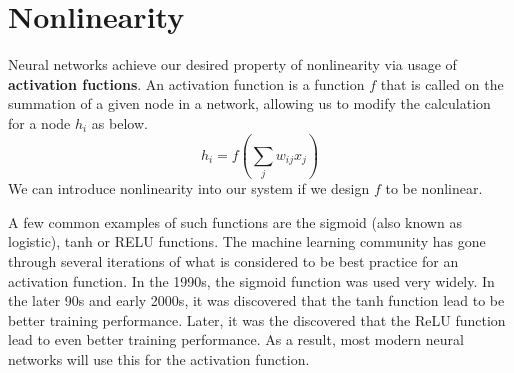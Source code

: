 \documentclass[12pt,letterpaper]{book}
\theoremstyle{definition}
\begin{document}
  \section{Nonlinearity}
  Neural networks achieve our desired property of nonlinearity via usage of \textbf{activation fuctions}.
  An activation function is a function $f$ that is called on the summation of a given node in a network, allowing 
  us to modify the calculation for a node $h_i$ as below.
  \[
    h_i = f\left(\sum_{j}w_{ij}x_j\right)
  \]
  We can introduce nonlinearity into our system if we design $f$ to be nonlinear. 

  A few common examples of such functions are the sigmoid (also known as logistic), tanh or RELU functions.
  The machine learning community has gone through several iterations of what is considered to be 
  best practice for an activation function. In the 1990s, the sigmoid function was used very widely.
  In the later 90s and early 2000s, it was discovered that the tanh function lead to be better 
  training performance. Later, it was the discovered that the ReLU function lead to even better 
  training performance. As a result, most modern neural networks will use this for the 
  activation function. 
\end{document}
